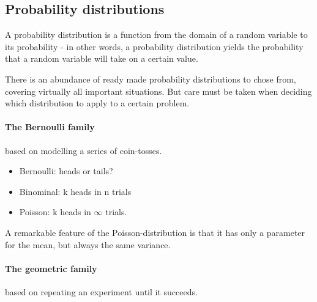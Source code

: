 \subsection{Probability distributions}

A probability distribution is a function from the domain of a random variable to its probability - in other words, a probability distribution yields the probability that a random variable will take on a certain value. 

There is an abundance of ready made probability distributions to chose from, covering virtually all important situations. But care must be taken when deciding which distribution to apply to a certain problem. 

\paragraph{The Bernoulli family} based on modelling a series of coin-tosses.
\begin{itemize}
    \item Bernoulli: heads or tails?
    \item Binominal: k heads in n trials
    \item Poisson: k heads in $\infty$ trials. 
\end{itemize}
A remarkable feature of the Poisson-distribution is that it has only a parameter for the mean, but always the same variance.

\paragraph{The geometric family} based on repeating an experiment until it succeeds. 
